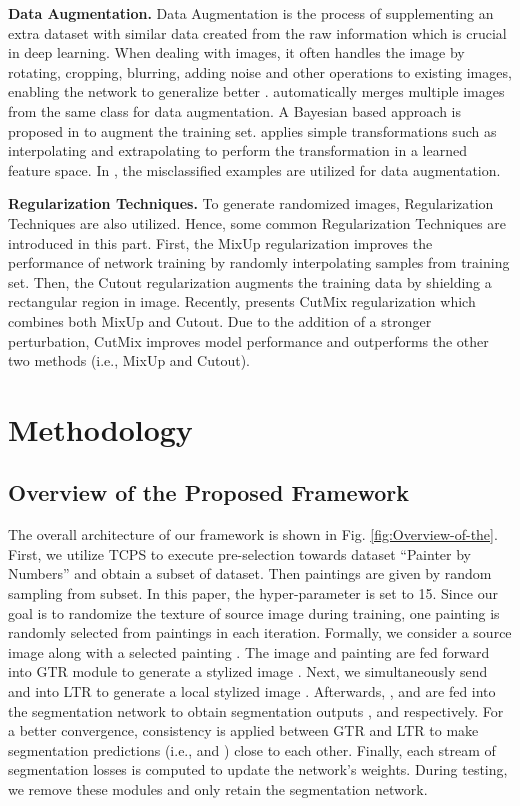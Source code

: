 \documentclass[twocolumn,journal,vlined,ruled,linesnumbered]{IEEEtran}
\begin{document}
\textbf{Data Augmentation.} Data Augmentation is the process of supplementing an extra dataset with similar data created from the raw information which is crucial in deep learning. When dealing with images, it often handles the image by rotating, cropping, blurring, adding noise and other operations to existing images, enabling the network to generalize better \cite{ciregan2012multi,sato2015apac,wan2013regularization,simard2003best}. \cite{lemley2017smart} automatically merges multiple images from the same class for data augmentation. A Bayesian based approach is proposed in \cite{tran2017bayesian} to augment the training set. \cite{devries2017dataset} applies simple transformations such as interpolating and extrapolating to perform the transformation in a learned feature space. In \cite{dreossi2018counterexample}, the misclassified examples are utilized for data augmentation.

\textbf{Regularization Techniques.} To generate randomized images, Regularization Techniques are also utilized. Hence, some common Regularization Techniques are introduced in this part. First, the MixUp regularization \cite{zhang2017mixup} improves the performance of network training by randomly interpolating samples from training set. Then, the Cutout regularization \cite{devries2017cutout} augments the training data by shielding a rectangular region in image. Recently, \cite{yun2019cutmix} presents CutMix regularization which combines both MixUp and Cutout. Due to the addition of a stronger perturbation, CutMix improves model performance and outperforms the other two methods (i.e., MixUp and Cutout).

\section{Methodology\label{sec:Methodology}}

\subsection{Overview of the Proposed Framework}

The overall architecture of our framework is shown in Fig. \ref{fig:Overview-of-the}. First, we utilize TCPS to execute pre-selection towards dataset ``Painter by Numbers\textquotedblright{} and obtain a subset of dataset. Then  paintings are given by random sampling from subset. In this paper, the hyper-parameter  is set to 15. Since our goal is to randomize the texture of source image during training, one painting  is randomly selected from  paintings in each iteration. Formally, we consider a source image  along with a selected painting . The image  and painting  are fed forward into GTR module to generate a stylized image . Next, we simultaneously send  and  into LTR to generate a local stylized image . Afterwards, ,  and  are fed into the segmentation network to obtain segmentation outputs\textbf{ },  and  respectively. For a better convergence, consistency is applied between GTR and LTR to make segmentation predictions (i.e.,  and ) close to each other. Finally, each stream of segmentation losses is computed to update the network's weights. During testing, we remove these modules and only retain the segmentation network. 
\end{document}
